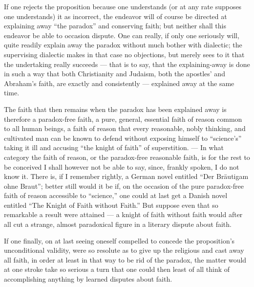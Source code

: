 \documentclass[12pt,a4paper]{book}
\begin{document}
If one rejects the proposition because one understands (or at any rate supposes one understands) it as
incorrect, the endeavor will of course be directed at
explaining away ``the paradox'' and conserving faith; but neither shall this endeavor be able to occasion
dispute. One can really, if only one seriously will, quite readily explain away the paradox without much
bother with dialectic; the supervising dialectic makes in that case no objections, but merely sees to it
that the undertaking really succeeds --- that is to say, that the explaining-away is done in such a way
that both Christianity and Judaism, both the apostles' and Abraham's faith, are exactly and consistently
--- explained away at the same time.

The faith that then remains when the paradox has been explained away is therefore a paradox-free faith, a
pure, general, essential faith of reason common to all human beings, a faith of reason that every
reasonable, nobly thinking, and cultivated man can be known to defend without exposing himself to
``science's'' taking it ill and accusing ``the knight of faith'' of superstition. --- In what
category the faith of reason, or the paradox-free reasonable faith, is for the rest to be conceived I
shall however not be able to say, since, frankly spoken, I do not know it. There is, if I remember
rightly, a German novel entitled ``Der Bräutigam ohne Braut''; better still would it be if, on the
occasion of the pure paradox-free faith of reason accessible to ``science,'' one could at last get a
Danish novel entitled ``The Knight of Faith without Faith.'' But suppose even that so remarkable a result
were attained --- a knight of faith without faith would after all cut a strange, almost paradoxical figure
in a literary dispute about faith.

If one finally, on at last seeing oneself compelled to concede the proposition's unconditional validity,
were so resolute as to give up the religious and cast away all faith, in order at least in that way to be
rid of the paradox, the matter would at one stroke take so serious a turn that one could then least of all
think of accomplishing anything by learned disputes about faith.
\end{document}

